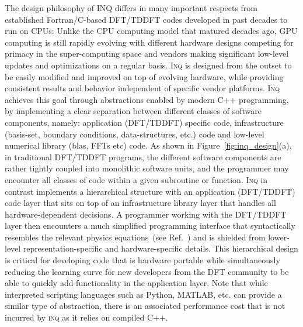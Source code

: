  The design philosophy of INQ differs in many important respects from established Fortran/C-based DFT/TDDFT codes developed in past decades to run on CPUs: Unlike the CPU computing model that matured decades ago, GPU computing is still rapidly evolving with different hardware designs competing for primacy in the super-computing space and vendors making significant low-level updates and optimizations on a regular basis.
\textsc{Inq} is designed from the outset to be easily modified and improved on top of evolving hardware, while providing consistent results and behavior independent of specific vendor platforms. 
\textsc{Inq} achieves this goal through abstractions enabled by modern C++ programming, by implementing a clear separation between different classes of software components, namely: application (DFT/TDDFT) specific code, infrastructure (basis-set, boundary conditions, data-structures, etc.) code and low-level numerical library (blas, FFTs etc) code. 
\newline 
\newline
As shown in Figure~\ref{fig:inq_design}(a), in traditional DFT/TDDFT programs, the different software components are rather tightly coupled into monolithic software units, and the programmer may encounter all classes of code within a given subroutine or function. 
\textsc{Inq} in contrast implements a hierarchical structure with an application (DFT/TDDFT) code layer that sits on top of an infrastructure library layer that handles all hardware-dependent decisions. 
A programmer working with the DFT/TDDFT layer then encounters a much simplified programming interface that syntactically resembles the relevant physics equations~(see Ref.~\cite{Andrade2021}) and is shielded from lower-level representation-specific and hardware-specific details. 
This hierarchical design is critical for developing code that is hardware portable while simultaneously reducing the learning curve for new developers from the DFT community to be able to quickly add functionality in the application layer. 
Note that while interpreted scripting languages such as Python, MATLAB, etc. can provide a similar type of abstraction, there is an associated performance cost that is not incurred by \textsc{inq} as it relies on compiled C++.

